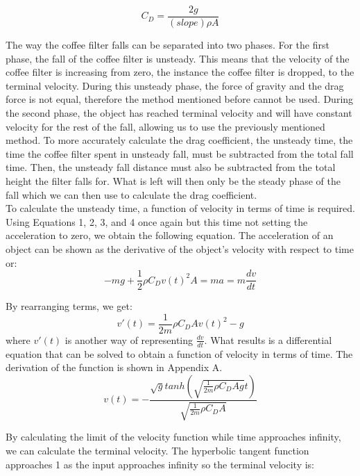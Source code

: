 \documentclass[12pt]{report}
\begin{document}
\begin{equation}
	C_D = \frac{2g}{(slope)\rho A}
\end{equation}

\noindent The way the coffee filter falls can be separated into two phases. For the first phase, the fall of the coffee filter is unsteady. This means that the velocity of the coffee filter is increasing from zero, the instance the coffee filter is dropped, to the terminal velocity. During this unsteady phase, the force of gravity and the drag force is not equal, therefore the method mentioned before cannot be used. During the second phase, the object has reached terminal velocity and will have constant velocity for the rest of the fall, allowing us to use the previously mentioned method. To more accurately calculate the drag coefficient, the unsteady time, the time the coffee filter spent in unsteady fall, must be subtracted from the total fall time. Then, the unsteady fall distance must also be subtracted from the total height the filter falls for. What is left will then only be the steady phase of the fall which we can then use to calculate the drag coefficient.\\

\noindent To calculate the unsteady time, a function of velocity in terms of time is required. Using Equations 1, 2, 3, and 4 once again but this time not setting the acceleration to zero, we obtain the following equation. The acceleration of an object can be shown as the derivative of the object's velocity with respect to time or:
\begin{equation}
	-mg + \frac{1}{2}\rho C_D v(t)^2 A = ma = m\frac{dv}{dt}
\end{equation}

\noindent By rearranging terms, we get:
\begin{equation}
	v'(t) = \frac{1}{2m}\rho C_D A v(t)^2 - g
\end{equation}
where $v'(t)$ is another way of representing $\frac{dv}{dt}$. What results is a differential equation that can be solved to obtain a function of velocity in terms of time. The derivation of the function is shown in Appendix A.\\

\begin{equation}
	v(t) = -\frac{\sqrt{g} tanh(\sqrt{\frac{1}{2m}\rho C_D A g}t)}{\sqrt{\frac{1}{2m}\rho C_D A}}
\end{equation}

\noindent By calculating the limit of the velocity function while time approaches infinity, we can calculate the terminal velocity. The hyperbolic tangent function approaches 1 as the input approaches infinity so the terminal velocity is:
\end{document}
